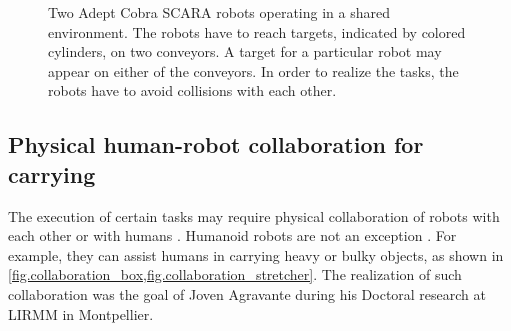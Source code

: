 %
\begin{figure}[!htb]
    \begin{minipage}[t]{0.49\textwidth}
    \end{minipage}
    \hfill
    \begin{minipage}[t]{0.49\textwidth}
    \end{minipage}
    \begin{minipage}[t]{0.49\textwidth}
    \end{minipage}
    \hfill
    \begin{minipage}[t]{0.49\textwidth}
    \end{minipage}
    \caption[Industrial manipulators in a shared environment.]{
        Two Adept Cobra \acs{SCARA} robots \cite{ADEPTsite} operating in a
        shared environment. The robots have to reach targets, indicated by
        colored cylinders, on two conveyors. A target for a particular robot
        may appear on either of the conveyors. In order to realize the tasks,
        the robots have to avoid collisions with each other.
    }
    \label{fig.cobra}
\end{figure}
%



\subsection{Physical human-robot collaboration for carrying}\label{sec.robot_collaboration}

The execution of certain tasks may require physical collaboration of robots
with each other or with humans \cite{Caccavale2008handbook,
Bicchi2008handbook}. Humanoid robots are not an exception
\cite{Agravante2016preprint}. For example, they can assist humans in carrying
heavy or bulky objects, as shown in
\cref{fig.collaboration_box,fig.collaboration_stretcher}. The realization of
such collaboration was the goal of Joven Agravante during his Doctoral research
at LIRMM in Montpellier.


